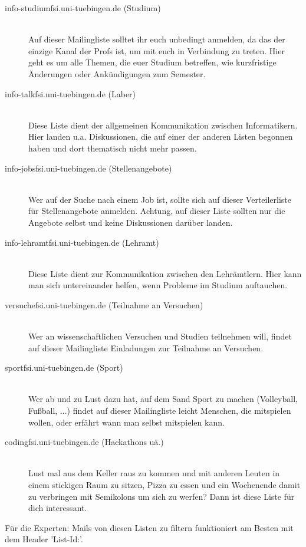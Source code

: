 \begin{description}

  \item[info-studium\At fsi.uni-tuebingen.de (Studium)] ~\\
  	Auf dieser Mailingliste solltet ihr euch unbedingt anmelden, da das der einzige 
  	Kanal der Profs ist, um mit euch in Verbindung zu treten. Hier geht es um alle 
  	Themen, die euer Studium betreffen, wie kurzfristige Änderungen oder Ankündigungen 
  	zum Semester.


  \item[info-talk\At fsi.uni-tuebingen.de (Laber)] ~\\
    Diese Liste dient der allgemeinen Kommunikation zwischen Informatikern.
    Hier landen u.a. Diskussionen, die auf einer der anderen Listen begonnen
    haben und dort thematisch nicht mehr passen.


  \item[info-jobs\At fsi.uni-tuebingen.de (Stellenangebote)] ~\\
    Wer auf der Suche nach einem Job ist, sollte sich auf dieser Verteilerliste
    für Stellenangebote anmelden. Achtung, auf dieser Liste sollten nur die
    Angebote selbst und keine Diskussionen darüber landen.


  \item[info-lehramt\At fsi.uni-tuebingen.de (Lehramt)] ~\\
  Diese Liste dient zur Kommunikation zwischen den Lehrämtlern. Hier kann man sich 
  untereinander helfen, wenn Probleme im Studium auftauchen.
  
  
  \item[versuche\At fsi.uni-tuebingen.de (Teilnahme an Versuchen)] ~\\
    Wer an wissenschaftlichen Versuchen und Studien teilnehmen will, findet auf dieser 
    Mailingliste Einladungen zur Teilnahme an Versuchen.
  
    
  \item[sport\At fsi.uni-tuebingen.de (Sport)] ~\\
  	Wer ab und zu Lust dazu hat, auf dem Sand Sport zu machen (Volleyball, Fußball, ...) 
  	findet auf dieser Mailingliste leicht Menschen, die mitspielen wollen, oder erfährt 
  	wann man selbst mitspielen kann.
  	
  	
  \item[coding\At fsi.uni-tuebingen.de (Hackathons uä.)] ~\\
  	Lust mal aus dem Keller raus zu kommen und mit anderen Leuten in einem stickigen Raum 
  	zu sitzen, Pizza zu essen und ein Wochenende damit zu verbringen mit Semikolons um 
  	sich zu werfen? Dann ist diese Liste für dich interessant.
  	

\end{description}

Für die Experten: Mails von diesen Listen zu filtern funktioniert am Besten mit dem Header 'List-Id:'.
